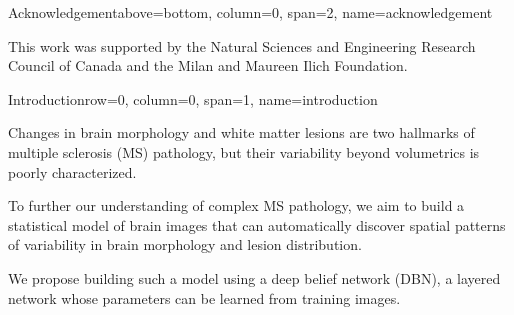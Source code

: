 \documentclass[%
landscape,paperwidth=42in,paperheight=48in,%
margin=2cm,
fontscale=0.295
]{baposter}
\begin{document}
\begin{poster}


\begin{headerblock}{Acknowledgement}{above=bottom, column=0,
span=2,
name=acknowledgement}

This work was supported by the Natural Sciences and Engineering Research Council
of Canada and the Milan and Maureen Ilich Foundation.

\end{headerblock}



\begin{headerblock}{Introduction}{row=0, column=0, span=1,
name=introduction}
\begin{compactitem}
  \item Changes in brain morphology and white matter lesions are two hallmarks
  of multiple sclerosis (MS) pathology, but their variability beyond volumetrics is
poorly characterized.
\item To further our understanding of complex MS pathology, we
aim to build a statistical model of brain images that can automatically discover
spatial patterns of variability in brain morphology and lesion distribution.
\item We propose building such a model using a deep belief network (DBN), a
layered network whose parameters can be learned from training images.
\end{compactitem}
\end{headerblock}


\end{poster}
\end{document}
